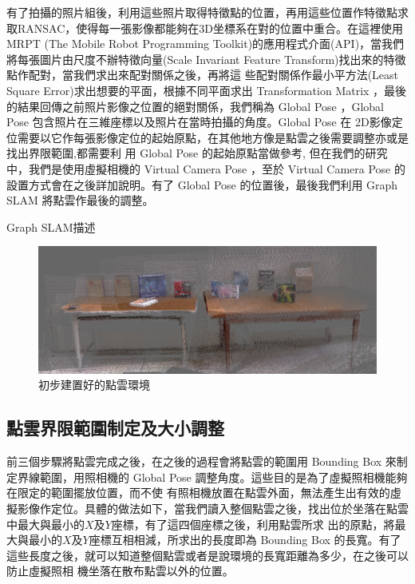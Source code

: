      
    有了拍攝的照片組後，利用這些照片取得特徵點的位置，再用這些位置作特徵點求取RANSAC，使得每一張影像都能夠在3D坐標系在對的位置中重合。在這裡使用 MRPT (The Mobile Robot
    Programming Toolkit)的應用程式介面(API)，當我們將每張圖片由尺度不辦特徵向量(Scale Invariant Feature Transform)找出來的特徵點作配對，當我們求出來配對關係之後，再將這
    些配對關係作最小平方法(Least Square Error)求出想要的平面，根據不同平面求出 Transformation Matrix ，最後的結果回傳之前照片影像之位置的絕對關係，我們稱為 Global Pose 
    ，Global Pose 包含照片在三維座標以及照片在當時拍攝的角度。Global Pose 在 2D影像定位需要以它作每張影像定位的起始原點，在其他地方像是點雲之後需要調整亦或是找出界限範圍,都需要利
    用 Global Pose 的起始原點當做參考, 但在我們的研究中，我們是使用虛擬相機的 Virtual Camera Pose ，至於 Virtual Camera Pose 的設置方式會在之後詳加說明。有了 Global Pose 
    的位置後，最後我們利用 Graph SLAM 將點雲作最後的調整。
   
    Graph SLAM描述     
          

\begin{figure}
  \includegraphics[width=\textwidth]{figures/3DPoint_Cloud_Map.jpg}
  \caption{初步建置好的點雲環境}
  \label{fig:Point Cloud Map}
\end{figure}


\subsection{點雲界限範圍制定及大小調整}
     
%     
    前三個步驟將點雲完成之後，在之後的過程會將點雲的範圍用 Bounding Box 來制定界線範圍，用照相機的 Global Pose 調整角度。這些目的是為了虛擬照相機能夠在限定的範圍擺放位置，而不使
    有照相機放置在點雲外面，無法產生出有效的虛擬影像作定位。具體的做法如下，當我們讀入整個點雲之後，找出位於坐落在點雲中最大與最小的$X$及$Y$座標，有了這四個座標之後，利用點雲所求
    出的原點，將最大與最小的$X$及$Y$座標互相相減，所求出的長度即為 Bounding Box 的長寬。有了這些長度之後，就可以知道整個點雲或者是說環境的長寬距離為多少，在之後可以防止虛擬照相
    機坐落在散布點雲以外的位置。

